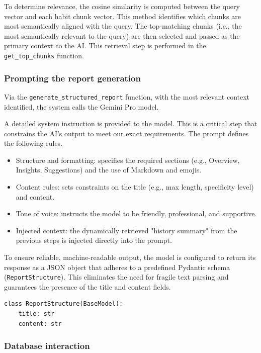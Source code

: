 \documentclass{article}
\begin{document}
To determine relevance, the cosine similarity is computed between the query vector and each habit chunk vector.
This method identifies which chunks are most semantically aligned with the query.
The top-matching chunks (i.e., the most semantically relevant to the query) are then selected and passed as the primary context to the AI.
This retrieval step is performed in the \verb|get_top_chunks| function.

\subsubsection{Prompting the report generation}

Via the \verb|generate_structured_report| function, with the most relevant context identified, the system calls the Gemini Pro model.

A detailed system instruction is provided to the model.
This is a critical step that constrains the AI’s output to meet our exact requirements.
The prompt defines the following rules.

\begin{itemize}
	\item Structure and formatting: specifies the required sections (e.g., Overview, Insights, Suggestions) and the use of Markdown and emojis.
	\item Content rules: sets constraints on the title (e.g., max length, specificity level) and content.
	\item Tone of voice: instructs the model to be friendly, professional, and supportive.
	\item Injected context: the dynamically retrieved "history summary" from the previous steps is injected directly into the prompt.
\end{itemize}

To ensure reliable, machine-readable output, the model is configured to return its response as a JSON object that adheres to a predefined Pydantic schema (\verb|ReportStructure|).
This eliminates the need for fragile text parsing and guarantees the presence of the title and content fields.

\begin{verbatim}
class ReportStructure(BaseModel):
    title: str
    content: str
\end{verbatim}

\subsubsection{Database interaction}
\end{document}
